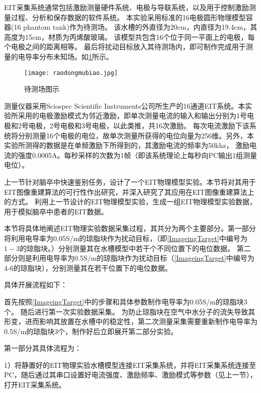EIT采集系统通常包括激励测量硬件系统、电极与导联系统，以及用于控制激励测量过程、分析和保存数据的软件系统。
本实验采用标准的16电极圆形物理模型容器(16 phantom tank)作为待测场。
该水槽的外直径为20cm，内直径为19.4cm，其高度为15cm，材质为丙烯酸玻璃。
该模型共包含16个位于同一平面上的电极，每个电极之间的距离相等。
最后将扰动目标放入其待测场内，即可制作完成用于测量的电导率分布未知场。如\cref{figure:raodongmubiao}所示。
\begin{figure}[H]
    \centering
    \texttt{[image: raodongmubiao.jpg]}
    \caption{待测场图示}
    \label{figure:raodongmubiao}
\end{figure}
测量仪器采用Sciospec Scientific Instruments公司所生产的16通道EIT系统。本实验所采用的电极激励模式为邻近激励，即单次测量电流的输入和输出分别为1号电极和2号电极，2号电极和3号电极，以此类推，共16次激励。
每次电流激励下该系统将分别测量16个电极的电位，故单次测量所获得的电位向量为256维。另外，本实验所测得的数据是在单频激励下所得到的，其激励电流的频率为50khz，
激励电流的强度0.0005A。每秒采样的次数为1帧（即该系统理论上每秒向PC输出1组测量电位）。




上一节针对脑卒中快速鉴别任务，设计了一个EIT物理模型实验。本节将对其用于EIT图像重建算法的可行性作出研究，并深入研究了其应用在EIT图像重建算法上的方式。
利用上一节设计的EIT物理模型实验，生成一组EIT物理模型实验数据，用于模拟脑卒中患者的EIT数据。



本节将具体地阐述EIT物理实验数据采集过程，其共分为两个主要部分。第一部分将利用电导率为0.05S/m的琼脂块作为扰动目标，（即\cref{ImageingTarget}中编号为$1-3$的琼脂块。）分别测量其在水槽模型中若干个不同位置下的电位数据。
第二部分则是利用电导率为0.5S/m的琼脂块作为扰动目标（\cref{ImageingTarget}中编号为4-6的琼脂块），分别测量其在若干位置下的电位数据。

具体开展流程如下：

首先按照\cref{ImageingTarget}中的步骤和具体参数制作电导率为0.05S/m的琼脂块3个。
随后进行第一次实验数据采集。
为防止琼脂块在空气中水分子的流失导致其形变，进而影响其放置在水槽中的稳定性，第二次测量采集需要重新制作电导率为0.5S/m的琼脂块3个，制作好后立即展开第二部分实验。

第一部分其具体流程为：

     1）将静置好的EIT物理实验水槽模型连接EIT采集系统，并将EIT采集系统连接至PC，随后通过其串口设置好电流强度、激励频率、激励模式等参数（见上一节），打开EIT采集系统。

